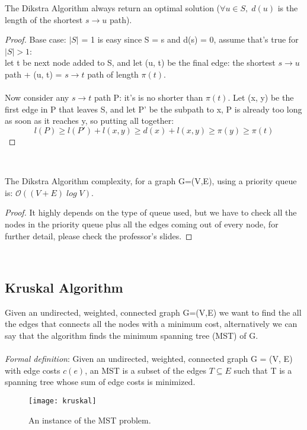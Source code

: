 \begin{claim}
    The Dikstra Algorithm always return an optimal solution ($\forall u \in S, \; d(u)$ is the length of the shortest $s\rightarrow u$ path).
\end{claim}
\begin{proof}
    Base case: $| S |$ = 1 is easy since S = { s } and d(s) = 0, assume that's true for $| S | > 1$:\\
    let t be next node added to S, and let (u, t) be the final edge: the shortest $s\rightarrow u$ path + (u, t) = $s\rightarrow t$ path of length $π(t)$.\\\\Now consider any $s\rightarrow t$ path P: it's is no shorter than $π(t)$. Let (x, y) be the first edge in P that leaves S, and let P' be the subpath to x, P is already too long as soon as it reaches y, so putting all together:
    \[l( P ) \geq l( P ' ) + l( x , y ) \geq d ( x ) + l( x , y ) \geq π ( y ) \geq π (t)\]
\end{proof}\\

\begin{claim}
    The Dikstra Algorithm complexity, for a graph G=(V,E), using a priority queue is: $\mathcal{O}{((V + E) \; log\; V)}$.
\end{claim}

\begin{proof}
    It highly depends on the type of queue used, but we have to check all the nodes in the priority queue plus all the edges coming out of every node, for further detail, please check the professor's slides.
\end{proof}\\


\subsection{Kruskal Algorithm}
Given an undirected, weighted, connected graph G=(V,E) we want to find the all the edges that connects all the nodes with a minimum cost, alternatively we can say that the algorithm finds the minimum spanning tree (MST) of G.\\\\
\emph{Formal definition}: Given an undirected, weighted, connected  graph G = (V, E) with edge costs $c(e)$, an MST is a subset of the edges $T \subseteq E$ such that T is a spanning tree whose sum of edge costs is minimized.

\begin{figure}[H]
    \centering
    \texttt{[image: kruskal]}
    \caption{An instance of the MST problem.}
\end{figure}

